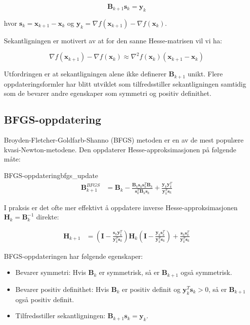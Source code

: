 \[
	\symbf{B}_{k+1}\symbf{s}_k = \symbf{y}_k
\]

hvor \(\symbf{s}_k = \symbf{x}_{k+1} - \symbf{x}_k\) og \(\symbf{y}_k = \nabla f(\symbf{x}_{k+1}) - \nabla f(\symbf{x}_k)\).

Sekantligningen er motivert av at for den sanne Hesse-matrisen vil vi ha:

\[
	\nabla f(\symbf{x}_{k+1}) - \nabla f(\symbf{x}_k) \approx \nabla^2 f(\symbf{x}_k)(\symbf{x}_{k+1} - \symbf{x}_k)
\]

Utfordringen er at sekantligningen alene ikke definerer \(\symbf{B}_{k+1}\) unikt. Flere oppdateringsformler har blitt utviklet som tilfredsstiller sekantligningen samtidig som de bevarer andre egenskaper som symmetri og positiv definithet.

\subsection{BFGS-oppdatering}
\label{subsec:bfgs_update}

Broyden-Fletcher-Goldfarb-Shanno (BFGS) metoden er en av de mest populære kvasi-Newton-metodene. Den oppdaterer Hesse-approksimasjonen på følgende måte:

\begin{definition}{BFGS-oppdatering}{bfgs_update}
	\begin{align*}
		\symbf{B}_{k+1}^{BFGS} & = \symbf{B}_k - \frac{\symbf{B}_k\symbf{s}_k\symbf{s}_k^T\symbf{B}_k}{\symbf{s}_k^T\symbf{B}_k\symbf{s}_k} + \frac{\symbf{y}_k\symbf{y}_k^T}{\symbf{y}_k^T\symbf{s}_k}
	\end{align*}
\end{definition}

I praksis er det ofte mer effektivt å oppdatere inverse Hesse-approksimasjonen \(\symbf{H}_k = \symbf{B}_k^{-1}\) direkte:

\begin{align*}
	\symbf{H}_{k+1} & = \left(\symbf{I} - \frac{\symbf{s}_k\symbf{y}_k^T}{\symbf{y}_k^T\symbf{s}_k}\right) \symbf{H}_k \left(\symbf{I} - \frac{\symbf{y}_k\symbf{s}_k^T}{\symbf{y}_k^T\symbf{s}_k}\right) + \frac{\symbf{s}_k\symbf{s}_k^T}{\symbf{y}_k^T\symbf{s}_k}
\end{align*}

BFGS-oppdateringen har følgende egenskaper:
\begin{itemize}
	\item Bevarer symmetri: Hvis \(\symbf{B}_k\) er symmetrisk, så er \(\symbf{B}_{k+1}\) også symmetrisk.
	\item Bevarer positiv definithet: Hvis \(\symbf{B}_k\) er positiv definit og \(\symbf{y}_k^T\symbf{s}_k > 0\), så er \(\symbf{B}_{k+1}\) også positiv definit.
	\item Tilfredsstiller sekantligningen: \(\symbf{B}_{k+1}\symbf{s}_k = \symbf{y}_k\).
\end{itemize}

